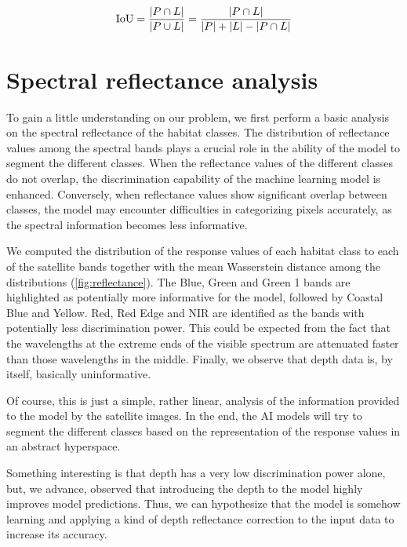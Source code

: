 \begin{equation*}
    \text{IoU} = \frac{\abs{P\cap L}}{\abs{P\cup L}}=\frac{\abs{P\cap
            L}}{\abs{P} + \abs{L} - \abs{P\cap L}}
\end{equation*}

\section{Spectral reflectance analysis}\label{app:spectral_reflectance}

To gain a little understanding on our problem, we first perform a basic
analysis on the spectral reflectance of the habitat classes. The distribution
of reflectance values among the spectral bands plays a crucial
role in the ability of the model to segment the different classes. When the
reflectance values of the different classes do not overlap, the discrimination
capability of the machine learning model is enhanced. Conversely, when
reflectance values show significant overlap between classes, the model may
encounter difficulties in categorizing pixels accurately, as the spectral
information becomes less informative.

We computed the distribution of the response values of each habitat class
to each of the satellite bands together with the mean Wasserstein distance
among the distributions (\cref{fig:reflectance}). The Blue, Green and Green 1
bands are highlighted as potentially more informative for the model, followed
by Coastal Blue and Yellow. Red, Red Edge and NIR are identified as the bands
with potentially less discrimination power. This could be expected from the
fact that the wavelengths at the extreme ends of the visible spectrum are
attenuated faster than those wavelengths in the middle. Finally, we observe
that depth data is, by itself, basically uninformative.

Of course, this is just a simple, rather linear, analysis of the
information provided to the model by the satellite images. In the end, the AI
models will try to segment the different classes based on the representation of
the response values in an abstract hyperspace.

Something interesting is that depth has a very low discrimination power
alone, but, we advance, observed that introducing the depth to the model highly
improves model predictions. Thus, we can hypothesize that the model is somehow
learning and applying a kind of depth reflectance correction to the input data
to increase its accuracy.

